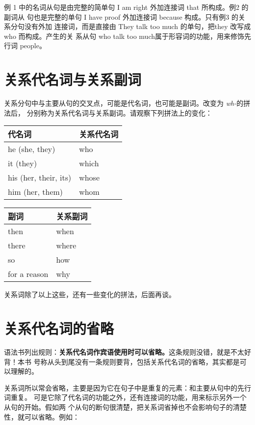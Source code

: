 例 1 中的名词从句是由完整的简单句 I am right 外加连接词 that 所构成。例2 的副词从
句也是完整的单句 I have proof 外加连接词 because 构成。只有例3 的关系分句没有外加
连接词，而是直接由 They talk too much 的单句，把they 改写成 who 而构成。产生的关
系从句 who talk too much属于形容词的功能，用来修饰先行词 people。

\section{关系代名词与关系副词}

关系分句中与主要从句的交叉点，可能是代名词，也可能是副词。改变为 \emph{wh-}的拼法后，
分别称为关系代名词与关系副词。请观察下列拼法上的变化：

\begin{longtable}[]{@{}ll@{}}
  \toprule
  代名词 & 关系代名词 \\
  \midrule
  he (she, they) & who \\
  it (they) & which \\
  his (her, their, its) & whose \\
  him (her, them) & whom \\
  \bottomrule
\end{longtable}

\begin{longtable}[]{@{}ll@{}}
  \toprule
  副词 & 关系副词 \\
  \midrule
  then & when \\
  there & where \\
  so & how \\
  for a reason & why \\
  \bottomrule
\end{longtable}

关系词除了以上这些，还有一些变化的拼法，后面再谈。

\section{关系代名词的省略}

语法书列出规则：\textbf{关系代名词作宾语使用时可以省略。}这条规则没错，就是不太好背！本书
号称从头到尾没有一条规则要背，包括关系代名词的省略，其实都是可以理解的。

关系词所以常会省略，主要是因为它在句子中是重复的元素：和主要从句中的先行词重复。
可是它除了代名词的功能之外，还有连接词的功能，用来标示另外一个从句的开始。假如两
个从句的断句很清楚，把关系词省掉也不会影响句子的清楚性，就可以省略。例如：

